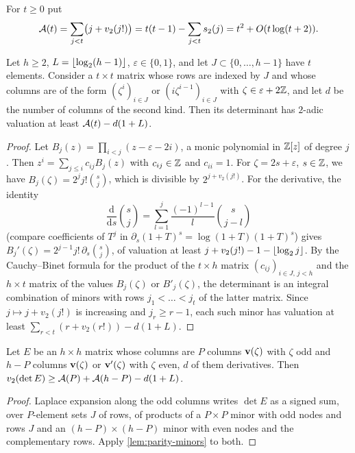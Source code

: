 For $t\ge0$ put
\[
  \mathcal{A}(t)=\sum_{j<t}\bigl(j+v_2(j!)\bigr)=t(t-1)-\sum_{j<t}s_2(j)=t^2+O(t\log(t+2)).
\]

\begin{lemma}\label{lem:parity-minors}
Let $h\ge2$, $L=\left\lfloor \log_2(h-1)\right\rfloor$, $\varepsilon\in\{0,1\}$, and let $J\subset\{0,\dots,h-1\}$
have $t$ elements. Consider a $t\times t$ matrix whose rows are indexed by $J$ and whose columns
are of the form $(\zeta^i)_{i\in J}$ or $(i\zeta^{i-1})_{i\in J}$ with
$\zeta\in\varepsilon+2\mathbb{Z}$, and let $d$ be the number of columns of the second kind. Then its
determinant has $2$-adic valuation at least $\mathcal{A}(t)-d(1+L)$.
\end{lemma}

\begin{proof}
Let $B_j(z)=\prod_{i<j}(z-\varepsilon-2i)$, a monic polynomial in $\mathbb{Z}[z]$ of degree $j$. Then
$z^i=\sum_{j\le i}c_{ij}B_j(z)$ with $c_{ij}\in\mathbb{Z}$ and $c_{ii}=1$. For $\zeta=2s+\varepsilon$,
$s\in\mathbb{Z}$, we have $B_j(\zeta)=2^jj!\binom sj$, which is divisible by $2^{j+v_2(j!)}$. For the
derivative, the identity
\begin{equation}\label{eq:binomial-derivative}
  \frac{\mathrm d}{\mathrm ds}\binom sj=\sum_{l=1}^{j}\frac{(-1)^{l-1}}{l}\binom s{j-l}
\end{equation}
(compare coefficients of $T^j$ in $\partial_s(1+T)^s=\log(1+T)(1+T)^s$) gives
$B_j'(\zeta)=2^{j-1}j!\,\partial_s\binom sj$, of valuation at least
$j+v_2(j!)-1-\left\lfloor \log_2j\right\rfloor$. By the Cauchy--Binet formula for the product of the $t\times h$
matrix $(c_{ij})_{i\in J,\,j<h}$ and the $h\times t$ matrix of the values $B_j(\zeta)$ or
$B'_j(\zeta)$, the determinant is an integral combination of minors with rows
$j_1<\dots<j_t$ of the latter matrix. Since $j\mapsto j+v_2(j!)$ is increasing and
$j_r\ge r-1$, each such minor has valuation at least $\sum_{r<t}(r+v_2(r!))-d(1+L)$.
\end{proof}

\begin{corollary}\label{cor:parity-laplace}
Let $E$ be an $h\times h$ matrix whose columns are $P$ columns $\mathbf{v}(\zeta)$ with $\zeta$ odd
and $h-P$ columns $\mathbf{v}(\zeta)$ or $\mathbf{v}'(\zeta)$ with $\zeta$ even, $d$ of them derivatives.
Then $v_2(\det E)\ge\mathcal{A}(P)+\mathcal{A}(h-P)-d(1+L)$.
\end{corollary}

\begin{proof}
Laplace expansion along the odd columns writes $\det E$ as a signed sum, over $P$-element sets
$J$ of rows, of products of a $P\times P$ minor with odd nodes and rows $J$ and an
$(h-P)\times(h-P)$ minor with even nodes and the complementary rows. Apply
\cref{lem:parity-minors} to both.
\end{proof}

